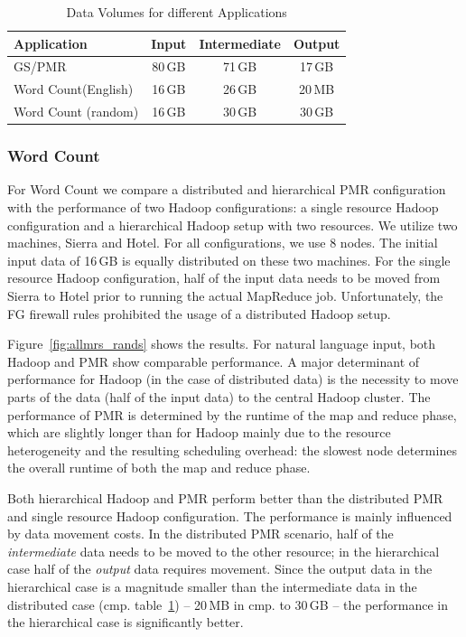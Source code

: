 \documentclass{acm_proc_article-sp}
\newcommand{\upp}{\vspace*{-0.5em}}
\begin{document}
\begin{table}[ht]
	\centering
\begin{tabular}{|p{2cm}|c|c|c|}
\hline
\textbf{Application} &\textbf{Input} &\textbf{Intermediate} &\textbf{Output}\\
\hline
GS/PMR 		&80\,GB &71\,GB		 &17\,GB\\
\hline
Word Count\linebreak[4] (English) &16\,GB&26\,GB&20\,MB\\
\hline
Word Count (random) &16\,GB&30\,GB&30\,GB\\
\hline
\end{tabular}
\caption{Data Volumes for different Applications\upp\upp}
\label{tab:data-volumes}
\end{table}

\upp\upp
\subsubsection*{Word Count}

For Word Count we compare a distributed and hierarchical PMR
configuration with the performance of two Hadoop configurations: a
single resource Hadoop configuration and a hierarchical Hadoop setup
with two resources. We utilize two machines, Sierra and Hotel. For all
configurations, we use 8 nodes. The initial input data of 16\,GB is
equally distributed on these two machines. For the single resource
Hadoop configuration, half of the input data needs to be moved from
Sierra to Hotel prior to running the actual MapReduce
job. Unfortunately, the FG firewall rules prohibited the usage
of a distributed Hadoop setup.

Figure~\ref{fig:allmrs_rands} shows the results. For natural language
input, both Hadoop and PMR show comparable performance. A major
determinant of performance for Hadoop (in the case of distributed
data) is the necessity to move parts of the data (half of the input
data) to the central Hadoop cluster. The performance of PMR is
determined by the runtime of the map and reduce phase, which are
slightly longer than for Hadoop mainly due to the resource
heterogeneity and the resulting scheduling overhead: the slowest node
determines the overall runtime of both the map and reduce phase.

Both hierarchical Hadoop and PMR perform better than
the distributed PMR and single resource Hadoop configuration. The
performance is mainly influenced by data movement costs. In the
distributed PMR scenario, half of the {\it intermediate} data needs to
be moved to the other resource; in the hierarchical case half of the
{\it output} data requires movement. Since the output data in the
hierarchical case is a magnitude smaller than the intermediate data in
the distributed case (cmp. table~\ref{tab:data-volumes}) -- 20\,MB in
cmp. to 30\,GB -- the performance in the hierarchical case is
significantly better.
\end{document}

